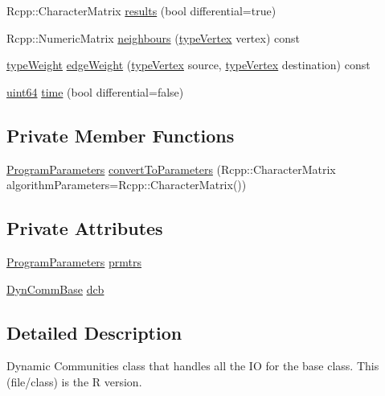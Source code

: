 \begin{DoxyCompactItemize}
\item 
Rcpp\+::\+Character\+Matrix \hyperlink{classDynCommRcpp_a4120d9f0232611e4ecb497eaf6e4706a}{results} (bool differential=true)
\item 
Rcpp\+::\+Numeric\+Matrix \hyperlink{classDynCommRcpp_abbda8cc950c360c1b89859ebe9233535}{neighbours} (\hyperlink{edge_8h_a5fbd20c46956d479cb10afc9855223f6}{type\+Vertex} vertex) const
\item 
\hyperlink{edge_8h_a2e7ea3be891ac8b52f749ec73fee6dd2}{type\+Weight} \hyperlink{classDynCommRcpp_a9a9aaf2512541f308d935e48c583f410}{edge\+Weight} (\hyperlink{edge_8h_a5fbd20c46956d479cb10afc9855223f6}{type\+Vertex} source, \hyperlink{edge_8h_a5fbd20c46956d479cb10afc9855223f6}{type\+Vertex} destination) const
\item 
\hyperlink{systemDefines_8h_abc0f5bc07737e498f287334775dff2b6}{uint64} \hyperlink{classDynCommRcpp_a89773080b66fd210a7e22234ba04a19f}{time} (bool differential=false)
\end{DoxyCompactItemize}
\subsection*{Private Member Functions}
\begin{DoxyCompactItemize}
\item 
\hyperlink{structProgramParameters}{Program\+Parameters} \hyperlink{classDynCommRcpp_a52692d421657ffcbe6a97762de9deddc}{convert\+To\+Parameters} (Rcpp\+::\+Character\+Matrix algorithm\+Parameters=Rcpp\+::\+Character\+Matrix())
\end{DoxyCompactItemize}
\subsection*{Private Attributes}
\begin{DoxyCompactItemize}
\item 
\hyperlink{structProgramParameters}{Program\+Parameters} \hyperlink{classDynCommRcpp_a686a84dced9c0cd812cb184d48958758}{prmtrs}
\item 
\hyperlink{classDynCommBase}{Dyn\+Comm\+Base} \hyperlink{classDynCommRcpp_a29aa77f1324fd9891a67feedea880961}{dcb}
\end{DoxyCompactItemize}


\subsection{Detailed Description}
Dynamic Communities class that handles all the IO for the base class. This (file/class) is the R version. 

